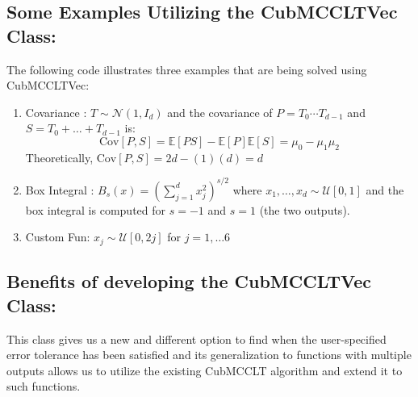 \subsection*{Some Examples Utilizing the CubMCCLTVec Class:}
The following code illustrates three examples that are being solved using CubMCCLTVec:
\begin{enumerate}
    \item Covariance \cite{qmcsoftware_notebook}: $T \sim \mathcal{N}(1,I_d)$ and the covariance of $P = T_0\cdots T_{d-1}$ and $S = T_0+\dots+T_{d-1}$ is:
$$\mathrm{Cov}[P,S] = \mathbb{E}[PS]-\mathbb{E}[P]\mathbb{E}[S] = \mu_0-\mu_1\mu_2$$
Theoretically, $\mathrm{Cov}[P,S] = 2d-(1)(d) = d$
    \item Box Integral \cite{BAILEY2007196}: $B_s(x) = (\sum_{j=1}^{d} x^2_j)^{s/2}$ where $x_1,\dots,x_d \sim \mathcal{U}[0,1]$ and the box integral is computed for $s=-1$ and $s=1$ (the two outputs).
    \item Custom Fun: $x_j \sim \mathcal{U}[0,2j]$ for $j=1,\dots6$
\end{enumerate}

    \begin{minipage}{.45\textwidth}
        
    \end{minipage}\hfill
    \begin{minipage}{.45\textwidth}
        
    \end{minipage}\hfill
    \begin{minipage}{.6\textwidth}
        
    \end{minipage}

\subsection*{Benefits of developing the CubMCCLTVec Class:}
This class gives us a new and different option to find when the user-specified error tolerance has been satisfied and its generalization to functions with multiple outputs allows us to utilize the existing CubMCCLT algorithm and extend it to such functions.



